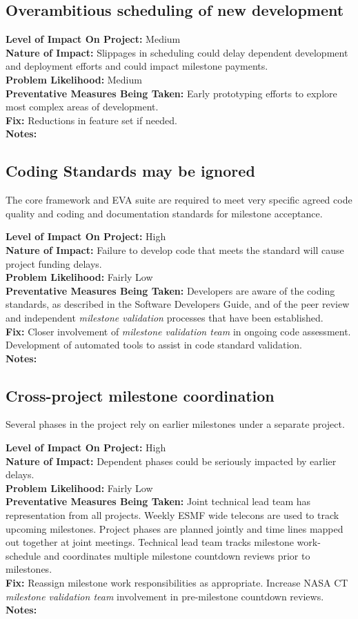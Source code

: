 \documentclass[english]{article}
\newcommand{\sreq}[1]{\subsection{\hspace{.2in}#1}}
\newenvironment
{reqlist}
{\begin{list} {} {} \rm \item[]}
{\end{list}}
\begin{document}
\sreq{Overambitious scheduling of new development}
\begin{reqlist}
{\bf Level of Impact On Project:} Medium \\
{\bf Nature of Impact:} Slippages in scheduling could delay dependent development and deployment efforts and could impact milestone payments.  \\
{\bf Problem Likelihood:} Medium \\
{\bf Preventative Measures Being Taken:} Early prototyping efforts to explore most
complex areas of development.
\\
{\bf Fix:} Reductions in feature set if needed.
\\
{\bf Notes:} 
\end{reqlist}


\sreq{Coding Standards may be ignored}
The core framework and EVA suite are required to meet very specific agreed code quality and coding
and documentation standards for milestone acceptance.
\begin{reqlist}
{\bf Level of Impact On Project:} High \\
{\bf Nature of Impact:}  Failure to develop code that meets the
standard will cause project funding delays.
 \\
{\bf Problem Likelihood:} Fairly Low \\
{\bf Preventative Measures Being Taken:} Developers are aware of the
coding standards, as described in the Software Developers Guide, and of the peer review and 
independent {\it milestone validation} processes that have been established.
\\
{\bf Fix:} Closer involvement of {\it milestone validation team} in ongoing code 
assessment. Development of automated tools to assist in code standard validation.
\\
{\bf Notes:} 
\end{reqlist}


\sreq{Cross-project milestone coordination}
Several phases in the project rely on earlier milestones under a separate
project.
\begin{reqlist}
{\bf Level of Impact On Project:} High \\
{\bf Nature of Impact:} Dependent phases could be seriously impacted by earlier delays.
\\
{\bf Problem Likelihood:} Fairly Low \\
{\bf Preventative Measures Being Taken:} Joint technical lead team has representation
from all projects. Weekly ESMF wide telecons are used to track upcoming
milestones. Project phases are planned jointly and time lines mapped out
together at joint meetings. Technical lead team tracks milestone
work-schedule and coordinates multiple milestone countdown reviews prior 
to milestones.
\\
{\bf Fix:} Reassign milestone work responsibilities as appropriate.
Increase NASA CT {\it milestone validation team} involvement in pre-milestone
countdown reviews.
\\
{\bf Notes:} 
\end{reqlist}
\end{document}

